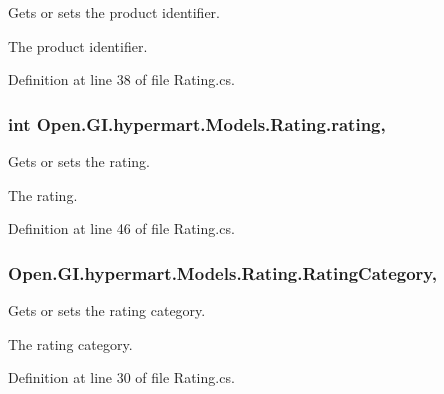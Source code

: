 Gets or sets the product identifier. 

The product identifier. 

Definition at line 38 of file Rating.\+cs.

\hypertarget{class_open_1_1_g_i_1_1hypermart_1_1_models_1_1_rating_a29969005b0621f4508ef831cd0cc883b}{}
\subsubsection[{rating}]{\setlength{\rightskip}{0pt plus 5cm}int Open.\+G\+I.\+hypermart.\+Models.\+Rating.\+rating\hspace{0.3cm}{\ttfamily [get]}, {\ttfamily [set]}}\label{class_open_1_1_g_i_1_1hypermart_1_1_models_1_1_rating_a29969005b0621f4508ef831cd0cc883b}


Gets or sets the rating. 

The rating. 

Definition at line 46 of file Rating.\+cs.

\hypertarget{class_open_1_1_g_i_1_1hypermart_1_1_models_1_1_rating_af62b00743fff0a6a82381d1a943fa619}{}
\subsubsection[{Rating\+Category}]{ Open.\+G\+I.\+hypermart.\+Models.\+Rating.\+Rating\+Category\hspace{0.3cm}{\ttfamily [get]}, {\ttfamily [set]}}\label{class_open_1_1_g_i_1_1hypermart_1_1_models_1_1_rating_af62b00743fff0a6a82381d1a943fa619}


Gets or sets the rating category. 

The rating category. 

Definition at line 30 of file Rating.\+cs.

\hypertarget{class_open_1_1_g_i_1_1hypermart_1_1_models_1_1_rating_a1e8a569cc68356a222db0eee305273f2}{}

